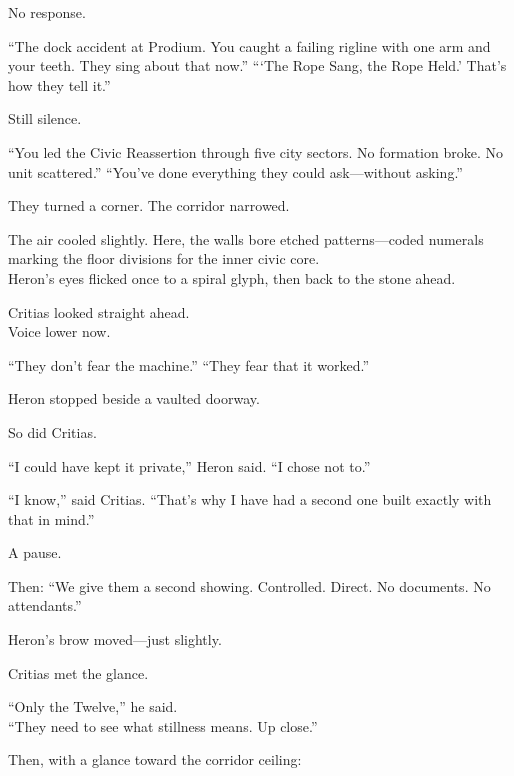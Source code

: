 \documentclass[12pt]{article}
\begin{document}
No response.

“The dock accident at Prodium. You caught a failing rigline with one arm and your teeth. They sing about that now.”  
“‘The Rope Sang, the Rope Held.’ That’s how they tell it.”

Still silence.

“You led the Civic Reassertion through five city sectors. No formation broke. No unit scattered.”  
“You’ve done everything they could ask—without asking.”

\vspace{1em}

They turned a corner. The corridor narrowed.

The air cooled slightly.  
Here, the walls bore etched patterns—coded numerals marking the floor divisions for the inner civic core.\\
Heron’s eyes flicked once to a spiral glyph, then back to the stone ahead.

Critias looked straight ahead.\\
Voice lower now.

“They don’t fear the machine.”  
“They fear that it worked.”

\vspace{1em}

Heron stopped beside a vaulted doorway.

So did Critias.

\vspace{1em}

“I could have kept it private,” Heron said.  
“I chose not to.”

“I know,” said Critias.  
“That’s why I have had a second one built exactly with that in mind.”

\vspace{1em}

A pause.

Then: “We give them a second showing. Controlled. Direct. No documents. No attendants.”

Heron’s brow moved—just slightly.

Critias met the glance.

\vspace{1em}

“Only the Twelve,” he said.\\
“They need to see what stillness means. Up close.”

\vspace{1em}

Then, with a glance toward the corridor ceiling:
\end{document}
